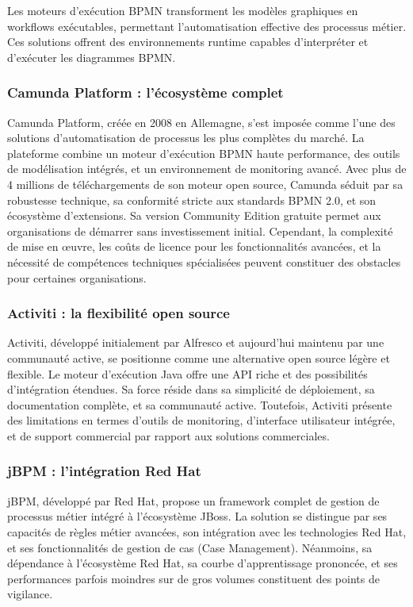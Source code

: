Les moteurs d'exécution BPMN transforment les modèles graphiques en workflows exécutables, permettant l'automatisation effective des processus métier. Ces solutions offrent des environnements runtime capables d'interpréter et d'exécuter les diagrammes BPMN.

\subsubsection{Camunda Platform : l'écosystème complet}
Camunda Platform, créée en 2008 en Allemagne, s'est imposée comme l'une des solutions d'automatisation de processus les plus complètes du marché. La plateforme combine un moteur d'exécution BPMN haute performance, des outils de modélisation intégrés, et un environnement de monitoring avancé. Avec plus de 4 millions de téléchargements de son moteur open source, Camunda séduit par sa robustesse technique, sa conformité stricte aux standards BPMN 2.0, et son écosystème d'extensions. Sa version Community Edition gratuite permet aux organisations de démarrer sans investissement initial. Cependant, la complexité de mise en œuvre, les coûts de licence pour les fonctionnalités avancées, et la nécessité de compétences techniques spécialisées peuvent constituer des obstacles pour certaines organisations.

\subsubsection{Activiti : la flexibilité open source}
Activiti, développé initialement par Alfresco et aujourd'hui maintenu par une communauté active, se positionne comme une alternative open source légère et flexible. Le moteur d'exécution Java offre une API riche et des possibilités d'intégration étendues. Sa force réside dans sa simplicité de déploiement, sa documentation complète, et sa communauté active. Toutefois, Activiti présente des limitations en termes d'outils de monitoring, d'interface utilisateur intégrée, et de support commercial par rapport aux solutions commerciales.

\subsubsection{jBPM : l'intégration Red Hat}
jBPM, développé par Red Hat, propose un framework complet de gestion de processus métier intégré à l'écosystème JBoss. La solution se distingue par ses capacités de règles métier avancées, son intégration avec les technologies Red Hat, et ses fonctionnalités de gestion de cas (Case Management). Néanmoins, sa dépendance à l'écosystème Red Hat, sa courbe d'apprentissage prononcée, et ses performances parfois moindres sur de gros volumes constituent des points de vigilance.


